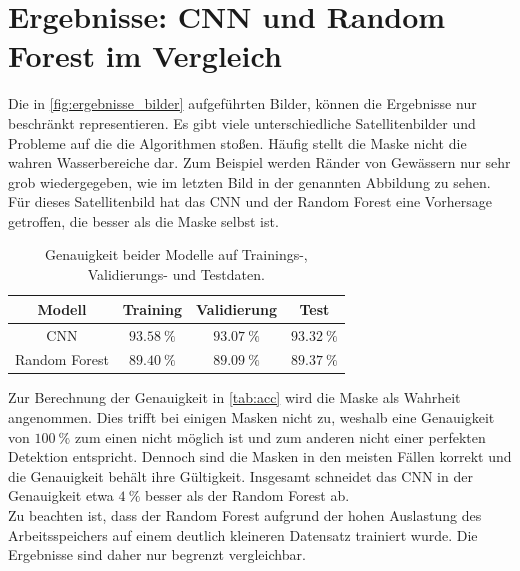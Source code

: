 \section{Ergebnisse: CNN und Random Forest im Vergleich}
\label{sec:vergleich}

Die in \autoref{fig:ergebnisse_bilder} aufgeführten Bilder, können die Ergebnisse nur beschränkt representieren.
Es gibt viele unterschiedliche Satellitenbilder und Probleme auf die die Algorithmen stoßen.
Häufig stellt die Maske nicht die wahren Wasserbereiche dar.
Zum Beispiel werden Ränder von Gewässern nur sehr grob wiedergegeben, wie im letzten Bild in der genannten Abbildung zu sehen.
Für dieses Satellitenbild hat das CNN und der Random Forest eine Vorhersage getroffen, die besser als die Maske selbst ist.

\begin{table}
    \centering
    \caption{Genauigkeit beider Modelle auf Trainings-, Validierungs- und Testdaten.}
    \label{tab:acc}
    \begin{tabular}{c | c c c}
        \toprule
        Modell & Training & Validierung & Test \\
        \midrule
        CNN & $\SI{93.58}{\percent}$ & $\SI{93.07}{\percent}$ & $\SI{93.32}{\percent}$ \\
        Random Forest & $\SI{89.40}{\percent}$ & $\SI{89.09}{\percent}$ & $\SI{89.37}{\percent}$ \\
        \bottomrule
    \end{tabular}
\end{table}

Zur Berechnung der Genauigkeit in \autoref{tab:acc} wird die Maske als Wahrheit angenommen.
Dies trifft bei einigen Masken nicht zu, weshalb eine Genauigkeit von $\SI{100}{\percent}$ zum einen nicht möglich ist und zum anderen nicht einer perfekten Detektion entspricht.
Dennoch sind die Masken in den meisten Fällen korrekt und die Genauigkeit behält ihre Gültigkeit.
Insgesamt schneidet das CNN in der Genauigkeit etwa $\SI{4}{\percent}$ besser als der Random Forest ab.
\\
Zu beachten ist, dass der Random Forest aufgrund der hohen Auslastung des Arbeitsspeichers auf einem deutlich kleineren Datensatz trainiert wurde.
Die Ergebnisse sind daher nur begrenzt vergleichbar.

